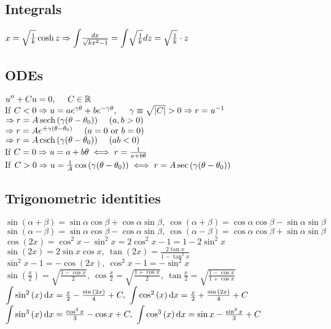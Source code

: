 \subsection{Integrals}
\begin{compactitem}
\item $x=\sqrt\frac{1}{k}\cosh{z}\then \scaleint{5ex}\frac{dx}{\sqrt{kx^{2}-1}}=\scaleint{5ex}\sqrt{\frac{1}{k}}dz=\sqrt{\frac{1}{k}}\cdot z$
\end{compactitem}




\subsection{ODEs}
\begin{compactitem}
	\item $u''+Cu=0,\ \ \ \ C\in\mathbb{R}$\\
	If $C<0\Rightarrow u=a e^{\gamma\theta}+b e^{-\gamma\theta},\ \ \ \ \gamma\equiv\sqrt{|C|}>0\Rightarrow r=u^{-1}$\\
	$\then r=A\sech{(\gamma(\theta-\theta_{0}))}\ \ \ \ (a,b>0)$\\
	$\then r=Ae^{\pm\gamma(\theta-\theta_{0})}\ \ \ \ (a=0 \text{ or }b=0)$\\
	$\then r=A\csch{(\gamma(\theta-\theta_{0}))}\ \ \ \ (ab<0)$\\
	If $C=0\Rightarrow u=a+b\theta\iff r=\frac{1}{a+b\theta}$\\
	If $C>0\Rightarrow u=\frac{1}{A}\cos{(\gamma(\theta-\theta_{0}))}\iff r=A\sec{(\gamma(\theta-\theta_{0}))}$
\end{compactitem}





\subsection{Trigonometric identities}
$\sin{(\alpha +\beta)}=\sin\alpha\cos\beta+\cos{\alpha}\sin\beta,\ \cos{(\alpha+\beta)}=\cos\alpha\cos\beta-\sin\alpha\sin\beta$\\
$\sin(\alpha-\beta)=\sin\alpha\cos\beta-\cos{\alpha}\sin\beta,\ \cos{(\alpha-\beta)}=\cos\alpha\cos\beta+\sin\alpha\sin\beta$\\
$\cos(2x)=\cos^2x-\sin^2x=2\cos^2x-1=1-2\sin^2x$\\
$\sin(2x)=2\sin x\cos x,\ \tan(2x)=\frac{2\tan x}{1-\tan^2x}$\\
$\sin^2x-1=-\cos(2x),\ \cos^2x-1=-\sin^2x$\\
$\sin(\frac{x}{2})=\sqrt{\frac{1-\cos x}{2}},\ \cos{\frac{x}{2}}=\sqrt{\frac{1+\cos x}{2}},\ \tan{\frac{x}{2}}=\sqrt{\frac{1-\cos x}{1+\cos{x}}}$\\
$\scaleint{5ex}\sin^{2}{(x)}\dd{x}=\frac{x}{2}-\frac{\sin{(2x)}}{4}+C,\ \scaleint{5ex}\cos^{2}{(x)}\dd{x}=\frac{x}{2}+\frac{\sin{(2x)}}{4}+C$\\
$\scaleint{5ex}\sin^{3}{(x)}\dd{x}=\frac{\cos^{3}{x}}{3}-\cos{x}+C,\ \scaleint{5ex}\cos^{3}{(x)}\dd{x}=\sin{x}-\frac{\sin^{3}{x}}{3}+C$



